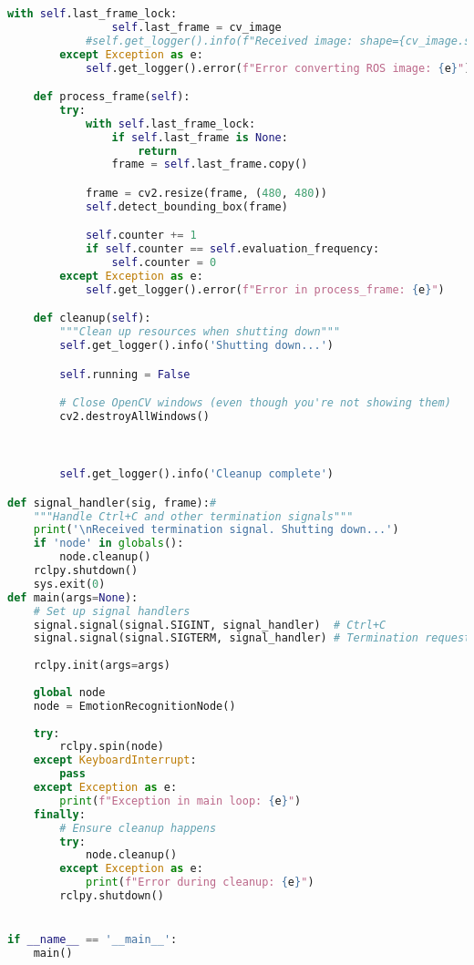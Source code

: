 \begin{lstlisting}[language=Python, caption={Python skript pre rozpoznávanie emócií}, label={lst:emotion-recognition}]
            with self.last_frame_lock:
                self.last_frame = cv_image
            #self.get_logger().info(f"Received image: shape={cv_image.shape}, dtype={cv_image.dtype}")
        except Exception as e:
            self.get_logger().error(f"Error converting ROS image: {e}")

    def process_frame(self):
        try:
            with self.last_frame_lock:
                if self.last_frame is None:
                    return
                frame = self.last_frame.copy()

            frame = cv2.resize(frame, (480, 480))
            self.detect_bounding_box(frame)

            self.counter += 1
            if self.counter == self.evaluation_frequency:
                self.counter = 0
        except Exception as e:
            self.get_logger().error(f"Error in process_frame: {e}")

    def cleanup(self):
        """Clean up resources when shutting down"""
        self.get_logger().info('Shutting down...')

        self.running = False

        # Close OpenCV windows (even though you're not showing them)
        cv2.destroyAllWindows()

        

        self.get_logger().info('Cleanup complete')

def signal_handler(sig, frame):#
    """Handle Ctrl+C and other termination signals"""
    print('\nReceived termination signal. Shutting down...')
    if 'node' in globals():
        node.cleanup()
    rclpy.shutdown()
    sys.exit(0)
def main(args=None):
    # Set up signal handlers
    signal.signal(signal.SIGINT, signal_handler)  # Ctrl+C
    signal.signal(signal.SIGTERM, signal_handler) # Termination request
    
    rclpy.init(args=args)
    
    global node
    node = EmotionRecognitionNode()
    
    try:
        rclpy.spin(node)
    except KeyboardInterrupt:
        pass
    except Exception as e:
        print(f"Exception in main loop: {e}")
    finally:
        # Ensure cleanup happens
        try:
            node.cleanup()
        except Exception as e:
            print(f"Error during cleanup: {e}")
        rclpy.shutdown()


if __name__ == '__main__':
    main()
\end{lstlisting}